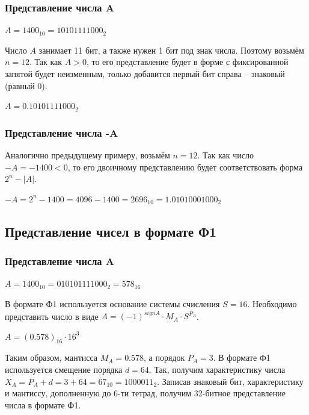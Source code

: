 \subsubsection{Представление числа A}
$A = 1400_{10} = 10101111000_{2}$

Число $A$ занимает 11 бит, а также нужен 1 бит под знак числа. Поэтому возьмём $n = 12$.
Так как $A > 0$, то его представление будет в форме с фиксированной запятой будет неизменным,
только добавится первый бит справа -- знаковый (равный $0$).

$A = 0.10101111000_{2}$

\subsubsection{Представление числа -A}
Аналогично предыдущему примеру, возьмём $n = 12$. Так как число $-A = -1400 < 0$, то
его двоичному представлению будет соответствовать форма $2^n - |A|$.

$-A = 2^n - 1400 = 4096 - 1400 = 2696_{10} = 1.01010001000_{2}$


\subsection{Представление чисел в формате Ф1}

\subsubsection{Представление числа A}
$A = 1400_{10} = 0101 0111 1000_{2} = 578_{16}$

В формате Ф1 используется основание системы счисления $S = 16$. Необходимо представить число в виде
$A = (-1)^{sign A} \cdot M_{A} \cdot S^{P_{A}}$.

$A = (0.578)_{16} \cdot 16^{3}$

Таким образом, мантисса $M_{A} = 0.578$, а порядок $P_{A} = 3$. В формате Ф1 используется смещение
порядка $d = 64$. Так, получим характеристику числа $X_{A}=P_{A}+d=3+64=67_{10}=1000011_{2}$. Записав знаковый 
бит, характеристику и мантиссу, дополненную до 6-ти тетрад, получим 32-битное представление числа
в формате Ф1. 

